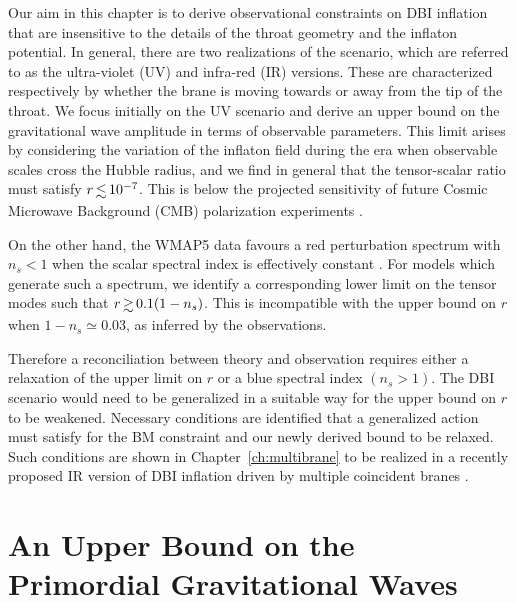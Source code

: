 Our aim in this chapter is to derive observational constraints on DBI inflation
that are 
insensitive to the details of the throat geometry and the inflaton potential. 
In general, there are two realizations of the scenario, 
which are referred to as the ultra-violet (UV) and infra-red (IR) 
versions. These are characterized respectively by whether the brane is 
moving towards or away from the tip of the throat. 
We focus initially on the UV scenario 
and derive an upper bound on 
the gravitational wave amplitude in terms of observable 
parameters. This limit arises by considering 
the variation of the inflaton field during the era when 
observable scales cross the Hubble radius, and 
we find in general that the tensor-scalar ratio must satisfy 
$r \, \lsim \, 10^{-7}$. This 
is below the projected sensitivity of future Cosmic Microwave Background (CMB) polarization 
experiments \cite{Baumann:2008aq,vpj}. 

On the other hand, the WMAP5 data 
favours a red perturbation spectrum with 
$n_s<1$ when  
the scalar spectral index is effectively constant \cite{Komatsu:2008hk}. 
For models which generate such a spectrum, 
we identify a corresponding lower limit on the 
tensor modes such that $r \, \gsim \, 0.1 (1-n_s)$. 
This is incompatible with the upper bound 
on $r$ when $1-n_s \simeq 0.03$, as inferred
by the observations. 

Therefore a reconciliation between theory and observation 
requires either a relaxation of the upper limit on $r$ or a blue 
spectral index $(n_s >1)$. The DBI scenario would need 
to be generalized in a suitable way for the upper bound on $r$
to be weakened. Necessary conditions are identified that a 
generalized action must satisfy for the BM constraint and our newly derived
bound to be relaxed. 
Such conditions are shown in Chapter~\ref{ch:multibrane} to be
realized in a recently proposed IR version of DBI inflation driven
by multiple coincident branes \cite{thomasward}. 

% 
% 
\section{An Upper Bound on the Primordial Gravitational Waves}
% 
\label{sec:upper-dbi}
%

